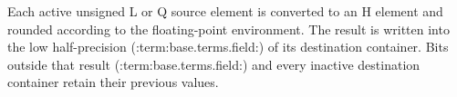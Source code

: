 Each active unsigned L or Q source element is converted to an H element and
rounded according to the floating-point environment. The result is written
into the low half-precision (:term:base.terms.field:) of its destination container. Bits outside
that result (:term:base.terms.field:) and every inactive destination container retain their
previous values.

